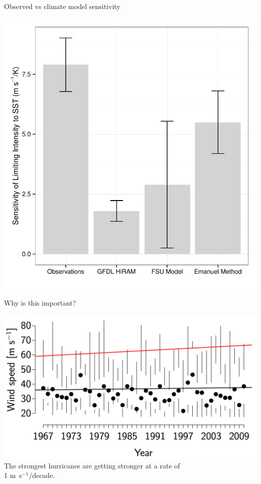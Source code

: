 \documentclass[handout]{beamer}
\begin{document}
\begin{frame}{Observed vs climate model sensitivity}
\begin{center}
\includegraphics[scale=.5]{figures/BarPlotSensitivity.pdf}\\
\end{center}
\end{frame}

\begin{frame}{Why is this important?}
\begin{center}
\includegraphics[scale=.18]{figures/TimeSeriesLMI.png}\\
The strongest hurricanes are getting stronger at a rate of\\ 1 m~s$^{-1}$/decade.
\end{center}
\end{frame}
\end{document}
